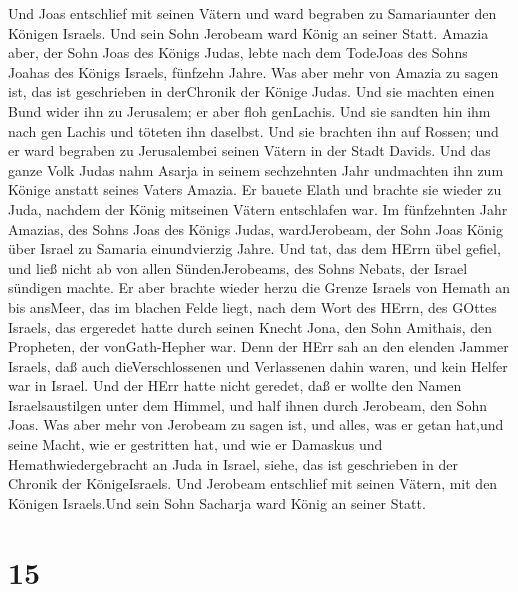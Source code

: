 Und Joas entschlief mit seinen Vätern und ward begraben zu
Samariaunter den Königen Israels. Und sein Sohn Jerobeam ward König an
seiner Statt.  Amazia aber, der Sohn Joas des Königs Judas,
lebte nach dem TodeJoas des Sohns Joahas des Königs Israels, fünfzehn
Jahre.  Was aber mehr von Amazia zu sagen ist, das ist
geschrieben in derChronik der Könige Judas.  Und sie
machten einen Bund wider ihn zu Jerusalem; er aber floh genLachis. Und
sie sandten hin ihm nach gen Lachis und töteten ihn daselbst.
 Und sie brachten ihn auf Rossen; und er ward begraben zu
Jerusalembei seinen Vätern in der Stadt Davids.  Und das
ganze Volk Judas nahm Asarja in seinem sechzehnten Jahr undmachten ihn
zum Könige anstatt seines Vaters Amazia.  Er bauete Elath
und brachte sie wieder zu Juda, nachdem der König mitseinen Vätern
entschlafen war.  Im fünfzehnten Jahr Amazias, des Sohns
Joas des Königs Judas, wardJerobeam, der Sohn Joas König über Israel zu
Samaria einundvierzig Jahre.  Und tat, das dem HErrn übel
gefiel, und ließ nicht ab von allen SündenJerobeams, des Sohns Nebats,
der Israel sündigen machte.  Er aber brachte wieder herzu
die Grenze Israels von Hemath an bis ansMeer, das im blachen Felde
liegt, nach dem Wort des HErrn, des GOttes Israels, das ergeredet hatte
durch seinen Knecht Jona, den Sohn Amithais, den Propheten, der
vonGath-Hepher war.  Denn der HErr sah an den elenden
Jammer Israels, daß auch dieVerschlossenen und Verlassenen dahin waren,
und kein Helfer war in Israel.  Und der HErr hatte nicht
geredet, daß er wollte den Namen Israelsaustilgen unter dem Himmel, und
half ihnen durch Jerobeam, den Sohn Joas.  Was aber mehr
von Jerobeam zu sagen ist, und alles, was er getan hat,und seine Macht,
wie er gestritten hat, und wie er Damaskus und Hemathwiedergebracht an
Juda in Israel, siehe, das ist geschrieben in der Chronik der
KönigeIsraels.  Und Jerobeam entschlief mit seinen Vätern,
mit den Königen Israels.Und sein Sohn Sacharja ward König an seiner
Statt.

\hypertarget{section-14}{%
\section{15}\label{section-14}}

